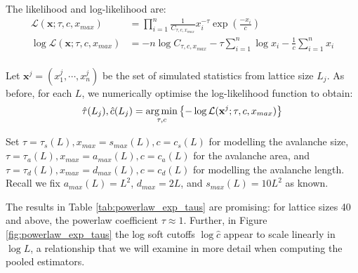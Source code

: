 The likelihood and log-likelihood are:
\begin{align*}
    \mathcal{L}(\mathbf{x}; \tau, c, x_{max}) &= \prod_{i=1}^n \frac{1}{C_{\tau, c, x_{max}}} x_i^{-\tau} \exp\left( \frac{-x_i}{c} \right) \\
    \log \mathcal{L}(\mathbf{x}; \tau, c, x_{max}) &= -n \log C_{\tau, c, x_{max}} -\tau \sum_{i=1}^n \log x_i - \frac{1}{c}\sum_{i=1}^n x_i \\
\end{align*}

Let $\mathbf{x}^j = (x_1^j, \cdots, x_n^j)$ be the set of simulated statistics from lattice size $L_j$. As before, for each $L$, we numerically optimise the log-likelihood function to obtain:
\[\hat{\tau}(L_j), \hat{c}(L_j) = \operatorname*{arg\,min}_{\tau, c}\left\{ -\log \mathcal{L}(\mathbf{x}^j; \tau, c, x_{max}) \right\}\]

Set $\tau = \tau_s(L), x_{max} = s_{max}(L), c = c_s(L)$ for modelling the avalanche size, $\tau = \tau_a(L), x_{max} = a_{max}(L), c = c_a(L)$ for the avalanche area, and $\tau = \tau_d(L), x_{max} = d_{max}(L), c = c_d(L)$ for modelling the avalanche length.
Recall we fix $a_{max}(L) = L^2$, $d_{max}=2L$, and $s_{max}(L) = 10L^2$ as known.

The results in Table \ref{tab:powerlaw_exp_taus} are promising: for lattice sizes 40 and above, the powerlaw coefficient $\tau \approx 1$.
Further, in Figure \ref{fig:powerlaw_exp_taus} the log soft cutoffs $\log \hat{c}$ appear to scale linearly in $\log L$, a relationship that we will examine in more detail when computing the pooled estimators.


